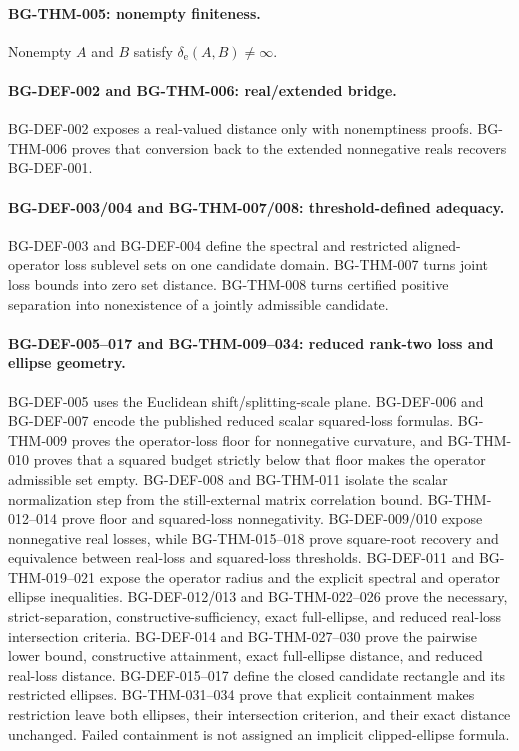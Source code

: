 \documentclass[11pt]{article}
\begin{document}
\paragraph{BG-THM-005: nonempty finiteness.}
Nonempty $A$ and $B$ satisfy $\delta_{\mathrm e}(A,B)\ne\infty$.

\paragraph{BG-DEF-002 and BG-THM-006: real/extended bridge.}
BG-DEF-002 exposes a real-valued distance only with nonemptiness proofs. BG-THM-006 proves
that conversion back to the extended nonnegative reals recovers BG-DEF-001.

\paragraph{BG-DEF-003/004 and BG-THM-007/008: threshold-defined adequacy.}
BG-DEF-003 and BG-DEF-004 define the spectral and restricted aligned-operator loss
sublevel sets on one candidate domain. BG-THM-007 turns joint loss bounds into zero set
distance. BG-THM-008 turns certified positive separation into nonexistence of a jointly
admissible candidate.

\paragraph{BG-DEF-005--017 and BG-THM-009--034: reduced rank-two loss and ellipse geometry.}
BG-DEF-005 uses the Euclidean shift/splitting-scale plane. BG-DEF-006 and BG-DEF-007
encode the published reduced scalar squared-loss formulas. BG-THM-009 proves the
operator-loss floor for nonnegative curvature, and BG-THM-010 proves that a squared
budget strictly below that floor makes the operator admissible set empty. BG-DEF-008 and
BG-THM-011 isolate the scalar normalization step from the still-external matrix
correlation bound. BG-THM-012--014 prove floor and squared-loss nonnegativity.
BG-DEF-009/010 expose nonnegative real losses, while BG-THM-015--018 prove
square-root recovery and equivalence between real-loss and squared-loss thresholds.
BG-DEF-011 and BG-THM-019--021 expose the operator radius and the explicit spectral and
operator ellipse inequalities. BG-DEF-012/013 and BG-THM-022--026 prove the necessary,
strict-separation, constructive-sufficiency, exact full-ellipse, and reduced real-loss
intersection criteria. BG-DEF-014 and BG-THM-027--030 prove the pairwise lower bound,
constructive attainment, exact full-ellipse distance, and reduced real-loss distance.
BG-DEF-015--017 define the closed candidate rectangle and its restricted ellipses.
BG-THM-031--034 prove that explicit containment makes restriction leave both ellipses,
their intersection criterion, and their exact distance unchanged. Failed containment is
not assigned an implicit clipped-ellipse formula.
\end{document}
